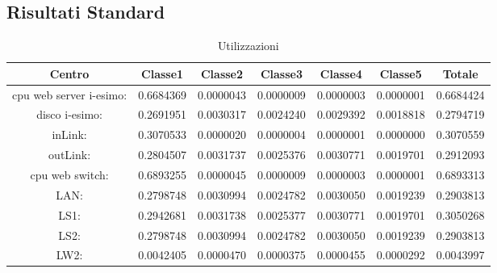 \subsection{Risultati Standard}
\begin{table}[H]
\begin{center}\begin{scriptsize}
\begin{tabular}{||c|c|c|c|c|c|c||}
\hline
Centro &Classe1 &Classe2 &Classe3 &Classe4 &Classe5 &Totale\\
\hline
\hline
 cpu web server i-esimo: 	&0.6684369	&0.0000043	&0.0000009	&0.0000003	&0.0000001	&0.6684424	\\\hline
 disco i-esimo: 	&0.2691951	&0.0030317	&0.0024240	&0.0029392	&0.0018818	&0.2794719	\\\hline
 inLink: 	&0.3070533	&0.0000020	&0.0000004	&0.0000001	&0.0000000	&0.3070559	\\\hline
 outLink: 	&0.2804507	&0.0031737	&0.0025376	&0.0030771	&0.0019701	&0.2912093	\\\hline
 cpu web switch: 	&0.6893255	&0.0000045	&0.0000009	&0.0000003	&0.0000001	&0.6893313	\\\hline
 LAN: 	&0.2798748	&0.0030994	&0.0024782	&0.0030050	&0.0019239	&0.2903813	\\\hline
 LS1: 	&0.2942681	&0.0031738	&0.0025377	&0.0030771	&0.0019701	&0.3050268	\\\hline
 LS2:	&0.2798748	&0.0030994	&0.0024782	&0.0030050	&0.0019239	&0.2903813	\\\hline
 LW2: 	&0.0042405	&0.0000470	&0.0000375	&0.0000455	&0.0000292	&0.0043997	\\\hline
\end{tabular}
\end{scriptsize}\end{center}
\caption{Utilizzazioni}
\label{utilizzazioni}
\end{table}

